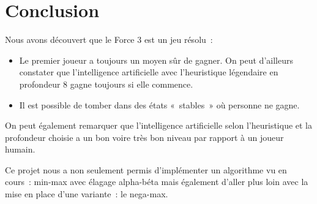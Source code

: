 \chapter{Conclusion}

Nous avons découvert que le Force 3 est un jeu résolu :
\begin{itemize}
    \item Le premier joueur a toujours un moyen sûr de gagner.
        On peut d'ailleurs constater que l'intelligence artificielle avec l'heuristique légendaire
        en profondeur 8 gagne toujours si elle commence.
    \item Il est possible de tomber dans des états « stables » où personne ne gagne.
\end{itemize}

On peut également remarquer que l'intelligence artificielle selon l'heuristique et la profondeur choisie
a un bon voire très bon niveau par rapport à un joueur humain.

Ce projet nous a non seulement permis d'implémenter un algorithme vu en cours : min-max avec élagage alpha-béta
mais également d'aller plus loin avec la mise en place d'une variante : le nega-max.

